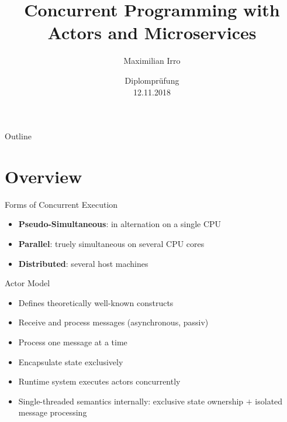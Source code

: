 \documentclass{beamer}
\title[Your Short Title]{Concurrent Programming with\\Actors and Microservices}
\author{Maximilian Irro}
\date{Diplomprüfung\\12.11.2018}
\begin{document}
\begin{frame}
  \titlepage
\end{frame}

\begin{frame}{Outline}
  \tableofcontents
\end{frame}


\section{Overview}


\begin{frame}{Forms of Concurrent Execution}

\begin{itemize}
  \item \textbf{Pseudo-Simultaneous}: in alternation on a single CPU
  \item \textbf{Parallel}: truely simultaneous on several CPU cores
  \item \textbf{Distributed}: several host machines
\end{itemize}

\end{frame}


\begin{frame}{Actor Model}

\begin{itemize}
  \item Defines theoretically well-known constructs
  \item Receive and process messages (asynchronous, passiv)
  \item Process one message at a time
  \item Encapsulate state exclusively
  \item Runtime system executes actors concurrently
  \item Single-threaded semantics internally: exclusive state ownership $+$ isolated message processing
\end{itemize}

\end{frame}

\end{document}
